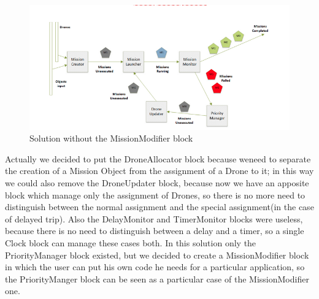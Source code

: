 \begin{figure}[htb]
  \centering
  \includegraphics[width=\linewidth]{pictures/NoMM.png}
  \caption{Solution without the MissionModifier block}
  \label{fig:noMM}
\end{figure}

Actually we decided to put the DroneAllocator block because weneed to separate the creation of a Mission Object from the assignment of a Drone to it; in this way we could also remove the DroneUpdater block, because now we have an apposite block which manage only the assignment of Drones, so there is no more need to distinguish between the normal assignment and the special assignment(in the case of delayed trip).
Also the DelayMonitor and TimerMonitor blocks were useless, because there is no need to distinguish between a delay and a timer, so a single Clock block can manage these cases both.
In this solution only the PriorityManager block existed, but we decided to create a MissionModifier block in which the user can put his own code he needs for a particular application, so the PriorityManger block can be seen as a particular case of the MissionModifier one.